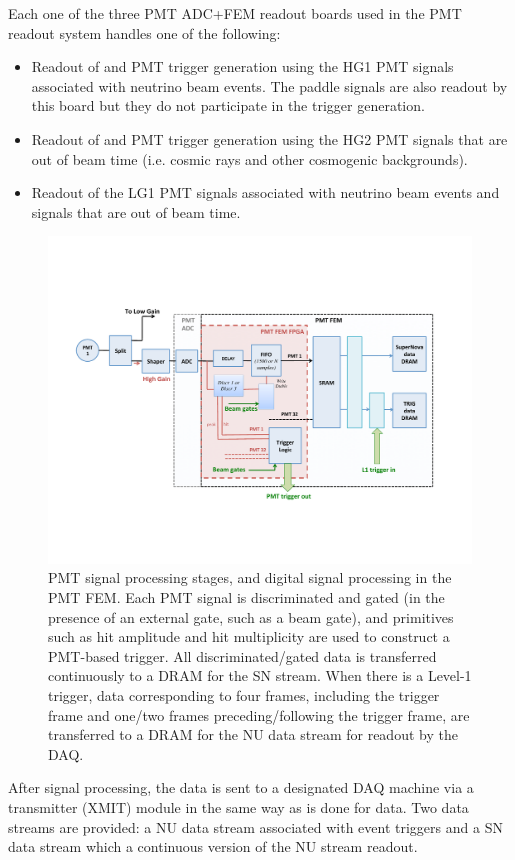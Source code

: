 Each one of the three PMT ADC+FEM readout boards used in the PMT readout system handles one of the following:

\begin{itemize}
\item Readout of and PMT trigger generation using the HG1 PMT signals associated with neutrino beam events. The paddle signals are also readout by this board but they do not participate in the trigger generation. 
\item Readout of and PMT trigger generation using the HG2 PMT signals that are out of beam time (i.e. cosmic rays and other cosmogenic backgrounds). 
\item Readout of the LG1 PMT signals associated with neutrino beam events and signals that are out of beam time.
\end{itemize}

\begin{figure}
\centering
\includegraphics[width=0.8\linewidth]{./figures/readout_7.pdf}%
\caption{\label{fig:readout_7}PMT signal processing stages, and digital signal processing in the PMT FEM. Each PMT signal is discriminated and gated (in the presence of an external gate, such as a beam gate), and primitives such as hit amplitude and hit multiplicity are used to construct a PMT-based trigger. All discriminated/gated data is transferred continuously to a DRAM for the SN stream. When there is a Level-1 trigger, data corresponding to four frames, including the trigger frame and one/two frames preceding/following the trigger frame, are transferred to a DRAM for the NU data stream for readout by the DAQ.}
\end{figure}

After signal processing, the data is sent to a designated DAQ machine via a transmitter (XMIT) module in the same way as is done for \lartpc data. Two data streams are provided: a NU data stream associated with event triggers and a SN data stream which a continuous version of the NU stream readout.

